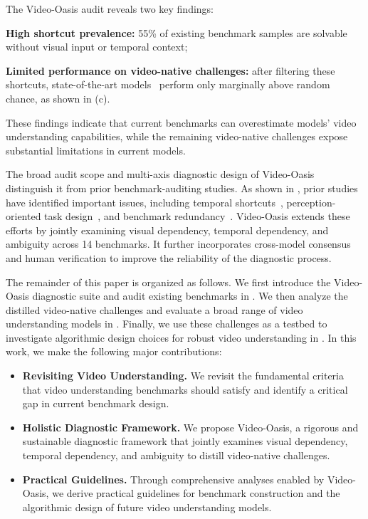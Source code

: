 \documentclass[runningheads]{llncs}
\begin{document}
{    The Video-Oasis audit reveals two key findings:
    \begin{enumerate*}[label=(\roman*)]
    \item \textbf{High shortcut prevalence:} 55\% of existing benchmark samples are solvable without visual input or temporal context;
    \item \textbf{Limited performance on video-native challenges:} after filtering these shortcuts, state-of-the-art models~\cite{qwem3_vl,videoautor1,longvilar1,internvl35} perform only marginally above random chance, as shown in (c).
    \end{enumerate*}
    These findings indicate that current benchmarks can overestimate models' video understanding capabilities, while the remaining video-native challenges expose substantial limitations in current models.

    The broad audit scope and multi-axis diagnostic design of Video-Oasis distinguish it from prior benchmark-auditing studies.
    As shown in , prior studies have identified important issues, including temporal shortcuts~\cite{egotempo}, perception-oriented task design~\cite{cambrian}, and benchmark redundancy~\cite{apollo}.
    Video-Oasis extends these efforts by jointly examining visual dependency, temporal dependency, and ambiguity across 14 benchmarks.
    It further incorporates cross-model consensus and human verification to improve the reliability of the diagnostic process.

    The remainder of this paper is organized as follows. We first introduce the Video-Oasis diagnostic suite and audit existing benchmarks in . We then analyze the distilled video-native challenges and evaluate a broad range of video understanding models in . Finally, we use these challenges as a testbed to investigate algorithmic design choices for robust video understanding in .
    In this work, we make the following major contributions:
    \begin{itemize}
        \item \textbf{Revisiting Video Understanding.} We revisit the fundamental criteria that video understanding benchmarks should satisfy and identify a critical gap in current benchmark design.
        \item \textbf{Holistic Diagnostic Framework.} We propose Video-Oasis, a rigorous and sustainable diagnostic framework that jointly examines visual dependency, temporal dependency, and ambiguity to distill video-native challenges.
        \item \textbf{Practical Guidelines.} Through comprehensive analyses enabled by Video-Oasis, we derive practical guidelines for benchmark construction and the algorithmic design of future video understanding models.
    \end{itemize}
}
\end{document}
